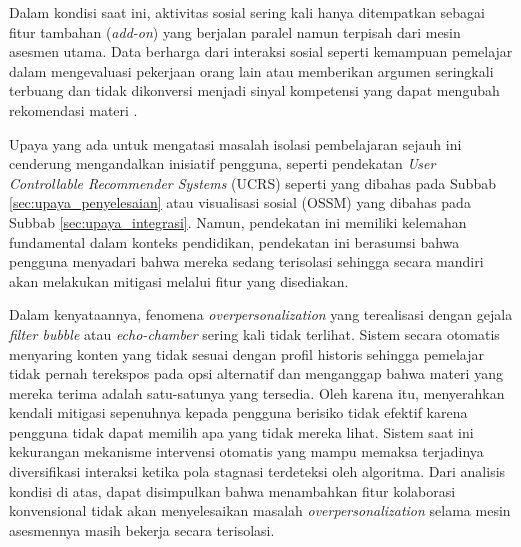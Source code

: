 Dalam kondisi saat ini, aktivitas sosial sering kali hanya ditempatkan sebagai fitur tambahan (\textit{add-on}) yang berjalan paralel namun terpisah dari mesin asesmen utama. Data berharga dari interaksi sosial seperti kemampuan pemelajar dalam mengevaluasi pekerjaan orang lain atau memberikan argumen seringkali terbuang dan tidak dikonversi menjadi sinyal kompetensi yang dapat mengubah rekomendasi materi \autocite{Ihichr2024}.

Upaya yang ada untuk mengatasi masalah isolasi pembelajaran sejauh ini cenderung mengandalkan inisiatif pengguna, seperti pendekatan \textit{User Controllable Recommender Systems} (UCRS) seperti yang dibahas pada Subbab \ref{sec:upaya_penyelesaian} atau visualisasi sosial (OSSM) yang dibahas pada Subbab \ref{sec:upaya_integrasi}. Namun, pendekatan ini memiliki kelemahan fundamental dalam konteks pendidikan, pendekatan ini berasumsi bahwa pengguna menyadari bahwa mereka sedang terisolasi sehingga secara mandiri akan melakukan mitigasi melalui fitur yang disediakan.

Dalam kenyataannya, fenomena \textit{overpersonalization} yang terealisasi dengan gejala \textit{filter bubble} atau \textit{echo-chamber} sering kali tidak terlihat. Sistem secara otomatis menyaring konten yang tidak sesuai dengan profil historis sehingga pemelajar tidak pernah terekspos pada opsi alternatif dan menganggap bahwa materi yang mereka terima adalah satu-satunya yang tersedia. Oleh karena itu, menyerahkan kendali mitigasi sepenuhnya kepada pengguna berisiko tidak efektif karena pengguna tidak dapat memilih apa yang tidak mereka lihat. Sistem saat ini kekurangan mekanisme intervensi otomatis yang mampu memaksa terjadinya diversifikasi interaksi ketika pola stagnasi terdeteksi oleh algoritma.
Dari analisis kondisi di atas, dapat disimpulkan bahwa menambahkan fitur kolaborasi konvensional tidak akan menyelesaikan masalah \textit{overpersonalization} selama mesin asesmennya masih bekerja secara terisolasi.

